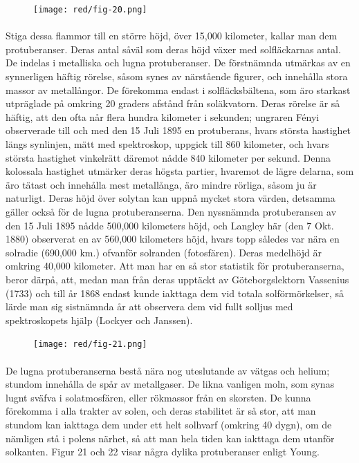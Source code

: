 \documentclass[a4paper, 12pt, oneside, swedish]{article}
\begin{document}
\begin{figure}[H]
\centering
\texttt{[image: red/fig-20.png]}
\caption{}
\end{figure}
\paragraph{}
Stiga dessa flammor till en större höjd, över 15,000 kilometer, kallar man dem protuberanser. Deras antal såväl som deras höjd växer med solfläckarnas antal. De indelas i metalliska och lugna protuberanser. De förstnämnda utmärkas av en synnerligen häftig rörelse, såsom synes av närstående figurer, och innehålla stora massor av metallångor. De förekomma endast i solfläcksbältena, som äro starkast utpräglade på omkring 20 graders afstånd från soläkvatorn. Deras rörelse är så häftig, att den ofta når flera hundra kilometer i sekunden; ungraren Fényi observerade till och med den 15 Juli 1895 en protuberans, hvars största hastighet längs synlinjen, mätt med spektroskop, uppgick till 860 kilometer, och hvars största hastighet vinkelrätt däremot nådde 840 kilometer per sekund. Denna kolossala hastighet utmärker deras högsta partier, hvaremot de lägre delarna, som äro tätast och innehålla mest metallånga, äro mindre rörliga, såsom ju är naturligt. Deras höjd över solytan kan uppnå mycket stora värden, detsamma gäller också för de lugna protuberanserna. Den nyssnämnda protuberansen av den 15 Juli 1895 nådde 500,000 kilometers höjd, och Langley här (den 7 Okt. 1880) observerat en av 560,000 kilometers höjd, hvars topp således var nära en solradie (690,000 km.) ofvanför solranden (fotosfären). Deras medelhöjd är omkring 40,000 kilometer. Att man har en så stor statistik för protuberanserna, beror därpå, att, medan man från deras upptäckt av Göteborgslektorn Vassenius (1733) och till år 1868 endast kunde iakttaga dem vid totala solförmörkelser, så lärde man sig sistnämnda år att observera dem vid fullt solljus med spektroskopets hjälp (Lockyer och Janssen).

\begin{figure}[H]
\centering
\texttt{[image: red/fig-21.png]}
\caption{}
\end{figure}
\paragraph{}
De lugna protuberanserna bestå nära nog uteslutande av vätgas och helium; stundom innehålla de spår av metallgaser. De likna vanligen moln, som synas lugnt sväfva i solatmosfären, eller rökmassor från en skorsten. De kunna förekomma i alla trakter av solen, och deras stabilitet är så stor, att man stundom kan iakttaga dem under ett helt solhvarf (omkring 40 dygn), om de nämligen stå i polens närhet, så att man hela tiden kan iakttaga dem utanför solkanten. Figur 21 och 22 visar några dylika protuberanser enligt Young.
\end{document}
